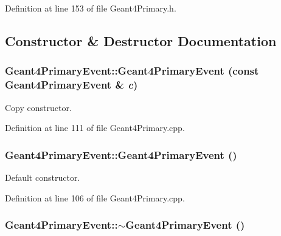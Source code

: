 Definition at line 153 of file Geant4Primary.h.

\subsection{Constructor \& Destructor Documentation}
\hypertarget{class_d_d4hep_1_1_simulation_1_1_geant4_primary_event_ae55dce4a449fe6d48475fa3a785d7be4}{
\subsubsection[{Geant4PrimaryEvent}]{\setlength{\rightskip}{0pt plus 5cm}Geant4PrimaryEvent::Geant4PrimaryEvent (const {\bf Geant4PrimaryEvent} \& {\em c})}}
\label{class_d_d4hep_1_1_simulation_1_1_geant4_primary_event_ae55dce4a449fe6d48475fa3a785d7be4}


Copy constructor. 

Definition at line 111 of file Geant4Primary.cpp.\hypertarget{class_d_d4hep_1_1_simulation_1_1_geant4_primary_event_aa17acb393dfaa92967d7f3f7779807cf}{
\subsubsection[{Geant4PrimaryEvent}]{\setlength{\rightskip}{0pt plus 5cm}Geant4PrimaryEvent::Geant4PrimaryEvent ()}}
\label{class_d_d4hep_1_1_simulation_1_1_geant4_primary_event_aa17acb393dfaa92967d7f3f7779807cf}


Default constructor. 

Definition at line 106 of file Geant4Primary.cpp.\hypertarget{class_d_d4hep_1_1_simulation_1_1_geant4_primary_event_ab4ddee2fb079f7b48eaabd24cbe8b021}{
\subsubsection[{$\sim$Geant4PrimaryEvent}]{\setlength{\rightskip}{0pt plus 5cm}Geant4PrimaryEvent::$\sim$Geant4PrimaryEvent ()}}
\label{class_d_d4hep_1_1_simulation_1_1_geant4_primary_event_ab4ddee2fb079f7b48eaabd24cbe8b021}


